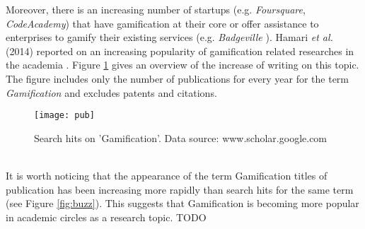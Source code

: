Moreover, there is an increasing number of startups (e.g. \textit{Foursquare}, \textit{CodeAcademy}) that have gamification  at  their  core \cite{codeacademy} or offer assistance to enterprises to gamify their existing services (e.g. \textit{Badgeville} \cite{badgeville}). Hamari \textit{et al.} (2014) reported on an increasing popularity of gamification related researches in the academia \cite{hamari2014does}. Figure \ref{fig:pub} gives an overview of the increase of writing on this topic. The figure includes only the number of publications for every year for the term \textit{Gamification} and excludes patents and citations. 
\begin{figure}[h]
    \centering
    \texttt{[image: pub]}
    \caption{Search hits on 'Gamification'. Data source: www.scholar.google.com}
    \label{fig:pub}
\end{figure}\\
It is worth noticing that the appearance of the term Gamification titles of publication has been increasing more rapidly than search hits for the same term (see Figure \ref{fig:buzz}). This suggests that Gamification is becoming more popular in academic circles as a research topic. TODO%
